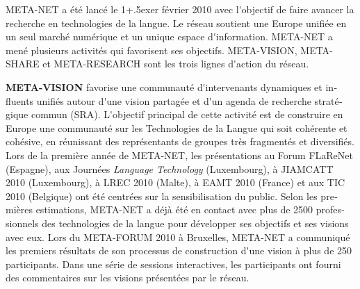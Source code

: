 \begin{french}
\begin{multicols}{2}
META-NET a été lancé le 1\raise+.5ex\hbox{er} février 2010 avec l{\mbox '}objectif de faire avancer la recherche en technologies de la langue. Le réseau soutient une Europe unifiée en un seul marché numérique et un unique espace d{\mbox '}information. META-NET a mené plusieurs activités qui favorisent ses objectifs. META-VISION, META-SHARE et META-RESEARCH sont les trois lignes d{\mbox '}action du réseau.


\textbf{META-VISION} favorise une communauté d{\mbox '}intervenants dynamiques et influents unifiés autour d{\mbox '}une vision partagée et d{\mbox '}un agenda de recherche stratégique commun (SRA). L{\mbox '}objectif principal de cette activité est de construire en Europe une communauté sur les Technologies de la Langue qui soit cohérente et cohésive, en réunissant des représentants de groupes très fragmentés et diversifiés. Lors de la première année de META-NET, les présentations au Forum FLaReNet (Espagne), aux Journées {\it Language Technology} (Luxembourg), à JIAMCATT 2010 (Luxembourg), à LREC 2010 (Malte), à EAMT 2010 (France) et aux TIC 2010 (Belgique) ont été centrées sur la sensibilisation du public. Selon les premières estimations, META-NET a déjà été en contact avec plus de 2500 professionnels des technologies de la langue pour développer ses objectifs et ses visions avec eux. Lors du META-FORUM 2010 à Bruxelles, META-NET a communiqué les premiers résultats de son processus de construction d{\mbox '}une vision à plus de 250 participants. Dans une série de sessions interactives, les participants ont fourni des commentaires sur les visions présentées par le réseau.


\end{multicols}
\end{french}
